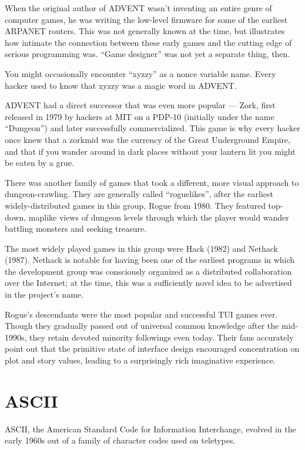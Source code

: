 \documentclass[12pt,letterpaper]{article}
\newcommand{\mc}{\small}
\newcommand{\acro}[1]{{\mc #1\spacefactor1000}}
\def\ASCII/{\acro{ASCII}}%
\begin{document}
When the original author of \acro{ADVENT} wasn't inventing an entire genre of computer
games, he was writing the low-level firmware for some of the earliest \acro{ARPANET}
routers. This was not generally known at the time, but illustrates how intimate
the connection between these early games and the cutting edge of serious
programming was. ``Game designer'' was not yet a separate thing, then.

You might occasionally encounter ``xyzzy'' as a nonce variable name. Every hacker
used to know that xyzzy was a magic word in \acro{ADVENT}.

\acro{ADVENT} had a direct successor that was even more popular --- Zork, first released
in 1979 by hackers at \acro{MIT} on a \acro{PDP-10} (initially under the name ``Dungeon'') and
later successfully commercialized. This game is why every hacker once knew that
a zorkmid was the currency of the Great Underground Empire, and that if you
wander around in dark places without your lantern lit you might be eaten by a
grue.

There was another family of games that took a different, more visual approach
to dungeon-crawling. They are generally called ``roguelikes'', after the earliest
widely-distributed games in this group, Rogue from 1980. They featured
top-down, maplike views of dungeon levels through which the player would wander
battling monsters and seeking treasure.

The most widely played games in this group were Hack (1982) and Nethack (1987).
Nethack is notable for having been one of the earliest programs in which the
development group was consciously organized as a distributed collaboration over
the Internet; at the time, this was a sufficiently novel idea to be advertised
in the project's name.

Rogue's descendants were the most popular and successful \acro{TUI} games ever. Though
they gradually passed out of universal common knowledge after the mid-1990s,
they retain devoted minority followings even today. Their fans accurately point
out that the primitive state of interface design encouraged concentration on
plot and story values, leading to a surprisingly rich imaginative experience.

\section{ASCII}
\ASCII/, the American Standard Code for Information Interchange, evolved in the
early 1960s out of a family of character codes used on teletypes.
\end{document}
